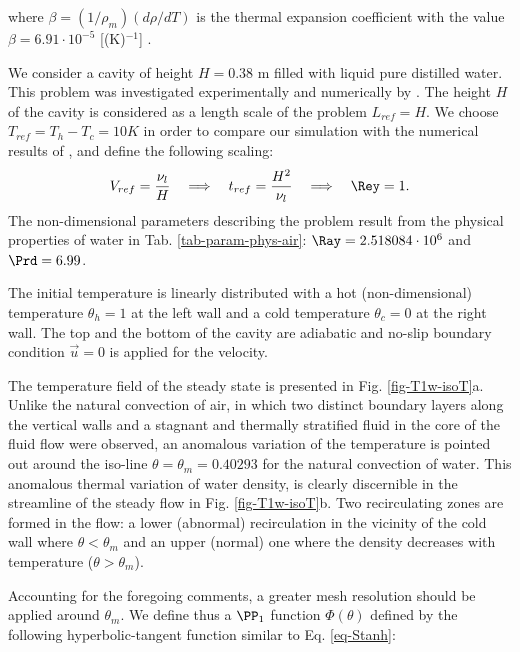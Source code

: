 \noindent where $\beta=(1/\rho_m) \left(d\rho/dT\right)$ is the thermal expansion coefficient with the value $\beta=6.91 \cdot 10^{-5}$ [(K)$^{-1}$] \citep{Scanlon2004}.

We consider a cavity of height $H = 0.38$ m filled with liquid pure distilled water.
This problem was investigated experimentally and numerically by \cite{Giangi-2000,Kowalewski-1999,Kowalewski-2003}.
The height $H$ of the cavity is considered as a length scale of the problem $L_{ref} = H$. 
We choose $T_{ref} = T_h - T_c = 10 K$ in order to compare our simulation with the numerical results of \cite{Kowalewski-2003},
and define the following scaling:
\begin{equation} \label{eq-def-scal-1}
   V_{ref} = \frac{\nu_l}{H} 
   \quad \Longrightarrow \quad t_{ref} = \frac{H^2}{\nu_l}
   \quad \Longrightarrow \quad \Rey = 1.
\end{equation} 
The non-dimensional parameters describing the problem result from the physical properties of water in Tab. \ref{tab-param-phys-air}: $\Ray=2.518084\cdot 10^{6}$ and $\Prd=6.99$. 

\noindent The initial temperature is linearly distributed with a hot (non-dimensional) temperature $\theta_h =1$ at the left wall and a cold temperature $\theta_c=0$ at the right wall. 
The top and the bottom of the cavity are adiabatic and no-slip boundary condition $\vec u = 0$ is applied for the velocity.

The temperature field of the steady state is presented in Fig. \ref{fig-T1w-isoT}a.
Unlike the natural convection of air, in which two distinct boundary layers along the vertical walls and a stagnant and thermally stratified fluid in the core of the fluid flow were observed, an anomalous variation of the temperature is pointed out around the iso-line $\theta = \theta_m = 0.40293$ for the natural convection of water.
This anomalous thermal variation of water density, is clearly discernible in the streamline of the steady flow in Fig. \ref{fig-T1w-isoT}b.
Two recirculating zones are formed in the flow: a lower (abnormal) recirculation  in the vicinity of the cold wall where $\theta<\theta_m$ and an upper (normal) one where the density decreases with temperature ($\theta>\theta_m$).

Accounting for the foregoing comments, a greater mesh resolution should be applied around $\theta_m$.
We define thus a $\PP_1$ function $\Phi(\theta)$ defined by the following hyperbolic-tangent function similar to Eq. \ref{eq-Stanh}:

